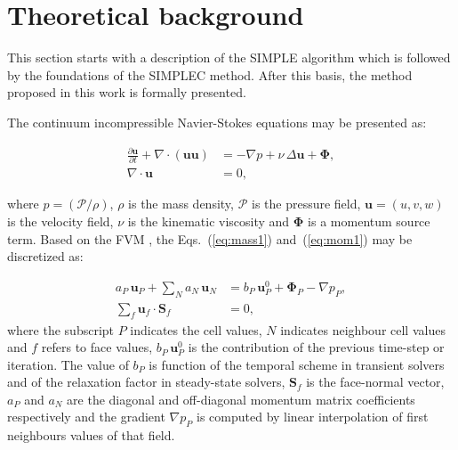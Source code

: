 \documentclass[final,3p,times,11pt,onecolumn]{myElsarticle}
\numberwithin{equation}{section}
\begin{document}
\section{Theoretical background} \label{sec:theory}
This section starts with a description of the SIMPLE algorithm which is followed by the foundations of the SIMPLEC method. After this basis, the method proposed in this work is formally presented.

The continuum incompressible Navier-Stokes equations may be presented as:

\begin{align}
\displaystyle \frac{\partial \boldsymbol{u}}{\partial t} + \nabla \cdotp (\boldsymbol{u} \boldsymbol{u}) &= -\nabla p + \nu\, \Delta \boldsymbol{u} + \boldsymbol{\Phi},
\label{eq:mom1}
\\
\displaystyle \nabla \cdotp \boldsymbol{u} &= 0, 
\label{eq:mass1}
\end{align}

\noindent where $\displaystyle p = (\mathcal{P}/\rho)$, $\rho$ is the mass density, $\mathcal{P}$ is the pressure field, $\boldsymbol{u} = (u,v,w)$ is the velocity field, $\nu$ is the kinematic viscosity and $\mathbf{\Phi}$ is a momentum source term.
Based on the FVM \cite{jasak}, the Eqs.~(\ref{eq:mass1}) and~(\ref{eq:mom1}) may be discretized as:

\begin{align}
a_P\,\boldsymbol{u}_P + \sum_{N} a_{N}\,\boldsymbol{u}_{N} &= b_P\, \boldsymbol{u}^0_P + \boldsymbol{\Phi}_P - \nabla p_P,
\label{eq:umom1}
\\
\sum_{f} \boldsymbol{u}_{f} \cdotp \textbf{S}_{f} &= 0, 
\label{eq:mass2} 
\end{align}
where the subscript $P$ indicates the cell values, $N$ indicates neighbour cell values and $f$ refers to face values, $b_P\, \boldsymbol{u}^0_P$ is the contribution of the previous time-step or iteration. The value of $b_P$ is function of the temporal scheme in transient solvers and of the relaxation factor in steady-state solvers, $\textbf{S}_{f}$ is the face-normal vector,  $a_P$ and $a_{N}$ are the diagonal and off-diagonal momentum matrix coefficients respectively and the gradient $\nabla p_P$ is computed by linear interpolation of first neighbours values of that field.
\end{document}
